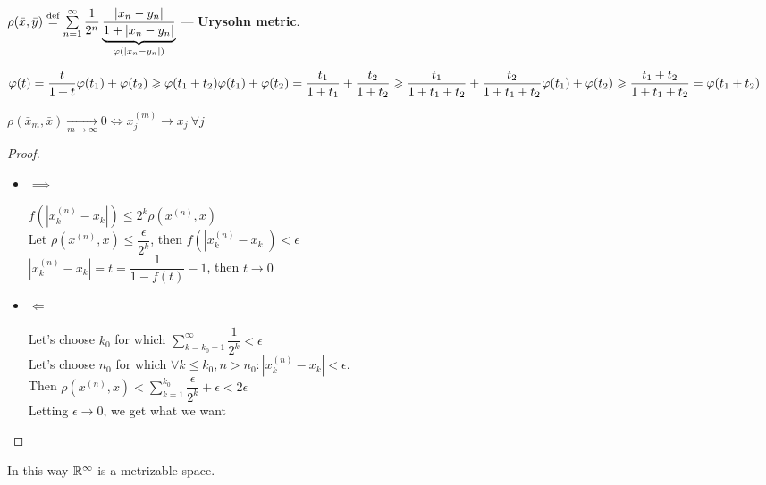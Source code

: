 \begin{defn}
  $\rho(\bar{x}, \bar{y}) \defeq \sum\limits_{n = 1}^\infty \dfrac{1}{2^n}\underbrace{\dfrac{|x_n - y_n|}{1 + |x_n - y_n|}}_{\phi(|x_n - y_n|)}$
  --- \textbf{Urysohn metric}.

  \noindent
  \begin{minipage}{.65\linewidth}
    $\displaystyle\phi(t) = \dfrac{t}{1 + t} \\ \\
    \phi(t_1) + \phi(t_2) \geq \phi(t_1 + t_2) \\ \\
    \phi(t_1) + \phi(t_2) = \dfrac{t_1}{1 + t_1} + \dfrac{t_2}{1 + t_2} \geq \dfrac{t_1}{1 + t_1 + t_2} + \dfrac{t_2}{1 + t_1 + t_2} \\ \\
    \phi(t_1) + \phi(t_2) \geq \dfrac{t_1 + t_2}{1 + t_1 + t_2} = \phi(t_1 + t_2)$
  \end{minipage}%
  \begin{minipage}{.35\linewidth}
  \end{minipage}
  \begin{stm}
      $\rho(\bar{x}_m, \bar{x}) \xrightarrow[m \to \infty]{} 0 \iff x_j^{(m)} \to x_j\ \forall j$
  \end{stm}
  \begin{proof}\leavevmode
    \begin{itemize}
      \item $\implies$

      $f(|x^{(n)}_k - x_k|) \leq 2^k \rho(x^{(n)}, x)$ \\
      Let $\rho(x^{(n)}, x) \le \dfrac{\epsilon}{2^k}$, then $f(|x^{(n)}_k - x_k|) < \epsilon$ \\
      $|x^{(n)}_k - x_k| = t = \dfrac{1}{1 - f(t)} - 1$, then $t \to 0$
      \item $\Leftarrow$

      Let's choose $k_0$ for which $\sum\limits_{k=k_0+1}^{\infty} \dfrac{1}{2^k} < \epsilon$ \\
      Let's choose $n_0$ for which $\forall k \leq k_0, n > n_0: |x_k^{(n)} - x_k| < \epsilon$. \\ 
      Then $\rho(x^{(n)}, x) < \sum\limits_{k=1}^{k_0} \dfrac{\epsilon}{2^k} + \epsilon < 2 \epsilon$ \\
      Letting  $\epsilon \to 0$, we get what we want \qedhere
    \end{itemize}
  \end{proof}
  In this way $\R^\infty$ is a metrizable space.
\end{defn}
